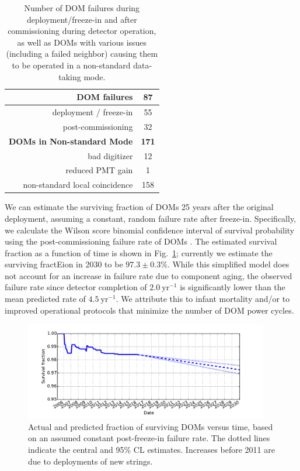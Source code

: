 \begin{table}[h]
  \centering
  \begin{tabular}{| r | c |}
    \hline
    \bf{DOM failures} & \bf{87} \\
    \hline    
    deployment / freeze-in & 55 \\
    post-commissioning & 32 \\
    \hline
    \hline
    \bf{DOMs in Non-standard Mode} & \bf{171} \\
    \hline
    bad digitizer & 12 \\
    reduced PMT gain & 1 \\
    non-standard local coincidence & 158 \\
    \hline    
  \end{tabular}
  \caption{Number of DOM failures during deployment/freeze-in and after
    commissioning during detector operation, as well as DOMs with various
    issues (including a failed neighbor) causing them to be operated in a
    non-standard data-taking mode.} 
  \label{tab:dom_failures}
\end{table}

We can estimate the surviving fraction of DOMs 25 years after the original
deployment, assuming a constant, random failure rate after freeze-in.
Specifically, we calculate the Wilson score binomial confidence interval of
survival probability using the post-commissioning failure rate of DOMs
\cite{Wilson_Score}.  The estimated survival fraction as a function of
time is shown in Fig.~\ref{fig:dom_survival}; currently we estimate the
surviving fractEion in 2030 to be $97.3\pm0.3\%$.  While this simplified
model does not account for an increase in failure rate due to component aging, the
observed failure rate since detector completion of $2.0~\mathrm{yr}^{-1}$ is
significantly lower than the mean predicted rate of $4.5~\mathrm{yr}^{-1}$.  We attribute
this to infant mortality and/or to improved operational protocols that
minimize the number of DOM power cycles.

\begin{figure}[!h]
 \centering
 \includegraphics[width=0.95\textwidth]{graphics/dom/reliability/dom_survival.pdf}
 \caption{Actual and predicted fraction of surviving DOMs versus time, based on an assumed
 constant post-freeze-in failure rate.  The dotted lines indicate the
 central and 95\% CL estimates.  Increases before 2011 are due
 to deployments of new strings.} 
 \label{fig:dom_survival}
\end{figure}


